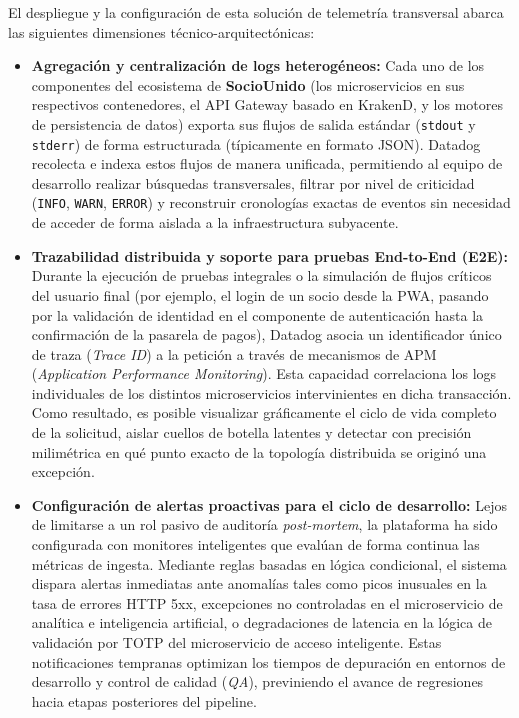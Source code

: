 El despliegue y la configuración de esta solución de telemetría transversal abarca las siguientes dimensiones técnico-arquitectónicas:

\begin{itemize}
    \item \textbf{Agregación y centralización de logs heterogéneos:} Cada uno de los componentes del ecosistema de \textbf{SocioUnido} (los microservicios en sus respectivos contenedores, el API Gateway basado en KrakenD, y los motores de persistencia de datos) exporta sus flujos de salida estándar (\texttt{stdout} y \texttt{stderr}) de forma estructurada (típicamente en formato JSON). Datadog recolecta e indexa estos flujos de manera unificada, permitiendo al equipo de desarrollo realizar búsquedas transversales, filtrar por nivel de criticidad (\texttt{INFO}, \texttt{WARN}, \texttt{ERROR}) y reconstruir cronologías exactas de eventos sin necesidad de acceder de forma aislada a la infraestructura subyacente.
    
    \item \textbf{Trazabilidad distribuida y soporte para pruebas End-to-End (E2E):} Durante la ejecución de pruebas integrales o la simulación de flujos críticos del usuario final (por ejemplo, el login de un socio desde la PWA, pasando por la validación de identidad en el componente de autenticación hasta la confirmación de la pasarela de pagos), Datadog asocia un identificador único de traza (\textit{Trace ID}) a la petición a través de mecanismos de APM (\textit{Application Performance Monitoring}). Esta capacidad correlaciona los logs individuales de los distintos microservicios intervinientes en dicha transacción. Como resultado, es posible visualizar gráficamente el ciclo de vida completo de la solicitud, aislar cuellos de botella latentes y detectar con precisión milimétrica en qué punto exacto de la topología distribuida se originó una excepción.
    
    \item \textbf{Configuración de alertas proactivas para el ciclo de desarrollo:} Lejos de limitarse a un rol pasivo de auditoría \textit{post-mortem}, la plataforma ha sido configurada con monitores inteligentes que evalúan de forma continua las métricas de ingesta. Mediante reglas basadas en lógica condicional, el sistema dispara alertas inmediatas ante anomalías tales como picos inusuales en la tasa de errores HTTP 5xx, excepciones no controladas en el microservicio de analítica e inteligencia artificial, o degradaciones de latencia en la lógica de validación por TOTP del microservicio de acceso inteligente. Estas notificaciones tempranas optimizan los tiempos de depuración en entornos de desarrollo y control de calidad (\textit{QA}), previniendo el avance de regresiones hacia etapas posteriores del pipeline.
    

\end{itemize}
